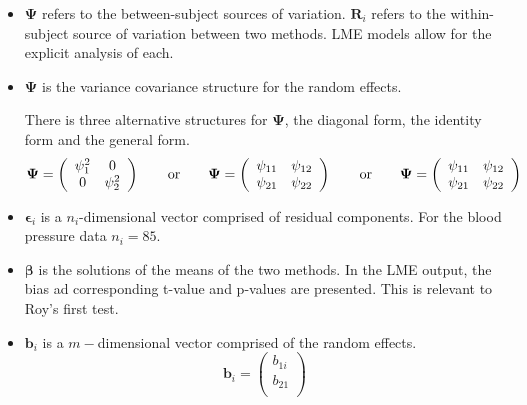 \documentclass[12pt, a4paper]{article}
\begin{document}
\begin{itemize}
	\item $\boldsymbol{\Psi}$ refers to the between-subject sources of variation. $\boldsymbol{R}_{i}$ refers to the within-subject
	source of variation between two methods. LME models allow for the explicit analysis of each.
	
	\item $\boldsymbol{\Psi}$ is the variance covariance structure for the random effects.
	
	
	There is three alternative structures for
	$\boldsymbol{\Psi}$, the diagonal form, the identity form and the general form.
	\[
	\boldsymbol{\Psi} =
	\left(%
	\begin{array}{c c}
	\psi^2_1 & 0  \\
	0 & \psi^2_2  \\
	\end{array}%
	\right)\qquad \mathrm{or} \qquad \boldsymbol{\Psi} =
	\left(%
	\begin{array}{c c}
	\psi_{11} & \psi_{12}  \\
	\psi_{21} & \psi_{22}  \\
	\end{array}%
	\right)
	\qquad \mathrm{or} \qquad \boldsymbol{\Psi} =
	\left(%
	\begin{array}{c c}
	\psi_{11} & \psi_{12}  \\
	\psi_{21} & \psi_{22}  \\
	\end{array}%
	\right)
	\]
	
	
	
	\item $\boldsymbol{\epsilon}_{i}$ is a $n_{i}$-dimensional vector
	comprised of residual components. For the blood pressure data $n_{i} = 85$.
	
	\item $\boldsymbol{\beta}$ is the solutions of the means of the two methods. In the LME output, the bias ad corresponding
	t-value and p-values are presented. This is relevant to Roy's first test.
	
	\item $\boldsymbol{b}_{i}$ is a $m-$dimensional vector comprised of
	the random effects.
	\begin{equation}
	\boldsymbol{b}_{i} = \left( \begin{array}{c}
	b_{1i} \\
	b_{21}  \\
	\end{array}\right)
	\end{equation}
	

\end{itemize}
\end{document}
